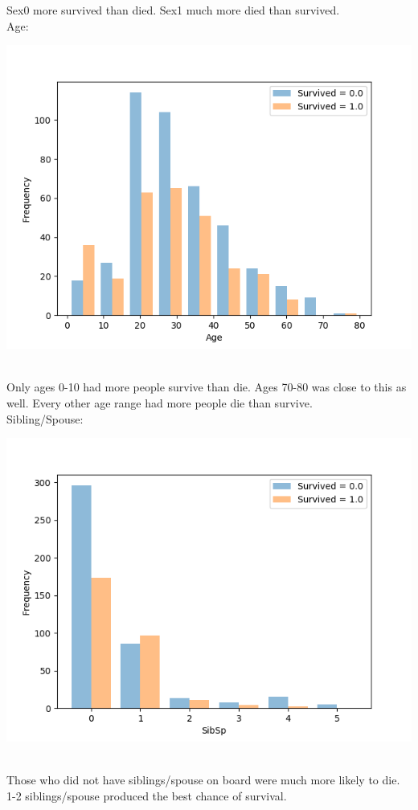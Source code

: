 \documentclass[11pt]{article}
\begin{document}
\begin{enumerate}
Sex0 more survived than died. Sex1 much more died than survived. \\
\newpage
Age: \\ 
\centerline{\includegraphics[scale=0.5]{3}} \\
Only ages 0-10 had more people survive than die. Ages 70-80 was close to this as well. Every other age range had more people die than survive.\\
Sibling/Spouse: \\
\centerline{\includegraphics[scale=0.5]{4}} \\
Those who did not have siblings/spouse on board were much more likely to die. 1-2 siblings/spouse produced the best chance of survival. \\

\end{enumerate}
\end{document}
